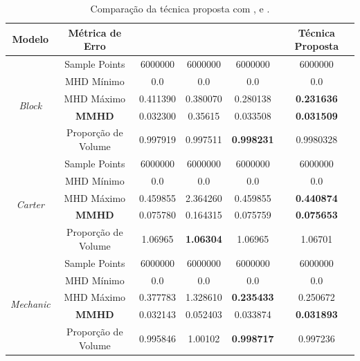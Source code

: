 \begin{table}[]
\centering
\footnotesize
\renewcommand{\arraystretch}{1.3}
\caption{Comparação da técnica proposta com \cite{zhang2015guided}, \cite{sun2007fast} e \cite{zheng2011bilateral}.}
\setlength\tabcolsep{2pt}
\begin{tabular}{ |c|c|c|c|c|c| } 
\hline
Modelo & Métrica de Erro & \cite{zhang2015guided} & \cite{sun2007fast} & \cite{zheng2011bilateral} & Técnica Proposta \\
\hline
\hline

\multirow{5}{4em}{\centering \textit{Block}} 
& Sample Points & 6000000 & 6000000 & 6000000 & 6000000\\ 
\cline{2-6}
& MHD Mínimo & 0.0 & 0.0 & 0.0 & 0.0\\ 
\cline{2-6}
& MHD Máximo & 0.411390 & 0.380070 & 0.280138 & \textbf{0.231636}\\ 
\cline{2-6}
& \textbf{MMHD} & 0.032300 & 0.35615 & 0.033508 & \textbf{0.031509} \\ 
\cline{2-6}
& Proporção de Volume & 0.997919 & 0.997511 & \textbf{0.998231} & 0.9980328\\ 
\cline{1-6}

\multirow{5}{4em}{\centering \textit{Carter}} 
& Sample Points & 6000000 & 6000000 & 6000000 & 6000000\\ 
\cline{2-6}
& MHD Mínimo & 0.0 & 0.0 & 0.0 & 0.0\\ 
\cline{2-6}
& MHD Máximo & 0.459855 & 2.364260 & 0.459855 & \textbf{0.440874}\\ 
\cline{2-6}
& \textbf{MMHD} & 0.075780 & 0.164315 & 0.075759 & \textbf{0.075653} \\ 
\cline{2-6}
& Proporção de Volume & 1.06965 & \textbf{1.06304} & 1.06965 & 1.06701\\ 
\cline{1-6}

\multirow{5}{4em}{\centering \textit{Mechanic}} 
& Sample Points & 6000000 & 6000000 & 6000000 & 6000000\\ 
\cline{2-6}
& MHD Mínimo & 0.0 & 0.0 & 0.0 & 0.0\\ 
\cline{2-6}
& MHD Máximo & 0.377783 & 1.328610 & \textbf{0.235433} & 0.250672\\ 
\cline{2-6}
& \textbf{MMHD} & 0.032143 & 0.052403 & 0.033874 & \textbf{0.031893} \\ 
\cline{2-6}
& Proporção de Volume & 0.995846 & 1.00102 & \textbf{0.998717} & 0.997236 \\ 
\cline{1-6}

\hline
\end{tabular}
\label{table:comparação_métricas}
\end{table}